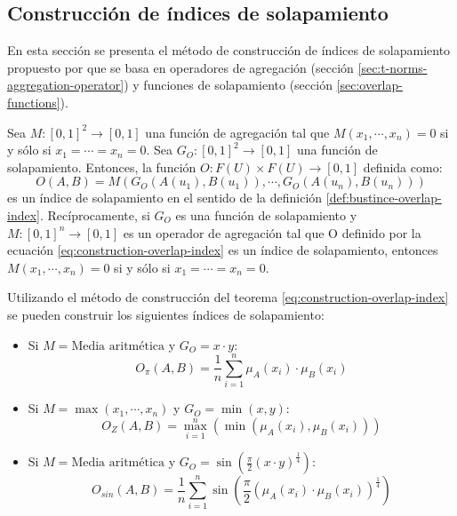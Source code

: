 \subsection{Construcción de índices de solapamiento}\label{sec:overlap-index-construction}
En esta sección se presenta el método de construcción de índices de solapamiento propuesto por \cite{bustince2013overlap} que se basa en operadores de agregación (sección \ref{sec:t-norms-aggregation-operator}) y funciones de solapamiento (sección \ref{sec:overlap-functions}).
\begin{theorem}
Sea $M : [0,1]^{2} \rightarrow [0,1]$ una función de agregación tal que $M(x_{1},\cdots,x_{n}) = 0$ si y sólo si $x_{1} = \cdots = x_{n} = 0$. Sea $G_{O} : [0,1]^{2} \rightarrow [0,1]$ una función de solapamiento. Entonces, la función $O: F(U) \times F(U) \rightarrow [0,1]$ definida como:
\begin{equation}\label{eq:construction-overlap-index}
O(A,B) = M(G_{O}(A(u_{1}),B(u_{1})),\cdots,G_{O}(A(u_{n}),B(u_{n})))
\end{equation}
es un índice de solapamiento en el sentido de la definición \ref{def:bustince-overlap-index}. Recíprocamente, si $G_{O}$ es una función de solapamiento y $M:[0,1]^{n} \rightarrow [0,1]$ es un operador de agregación tal que O definido por la ecuación \ref{eq:construction-overlap-index} es un índice de solapamiento, entonces $M(x_{1},\cdots,x_{n}) = 0$ si y sólo si $x_{1} = \cdots = x_{n} = 0$.
\end{theorem}

\begin{example}
\normalfont
Utilizando el método de construcción del teorema \ref{eq:construction-overlap-index} se pueden construir los siguientes índices de solapamiento:

\begin{itemize}
	\item Si $M = \text{Media aritmética}$ y $G_O = x \cdot y$:
	\begin{equation}
	O_{\pi}(A,B) = \frac{1}{n}\sum_{i=1}^{n}\mu_A(x_i) \cdot \mu_B(x_i)
	\end{equation}
	\item Si $M = \max(x_1,\cdots,x_n)$ y $G_O = \min(x,y)$:
	\begin{equation}
	O_{Z}(A,B) = \max\limits_{i=1}^{n}(\min(\mu_A(x_i),\mu_B(x_i)))
	\end{equation}
	\item Si $M = \text{Media aritmética}$ y $G_O = \sin(\frac{\pi}{2}(x \cdot y)^{\frac{1}{4}})$:
	\begin{equation}
	O_{sin}(A, B) = \frac{1}{n}\sum_{i=1}^{n}\sin(\frac{\pi}{2}(\mu_A(x_i) \cdot \mu_B(x_i))^{\frac{1}{4}})
	\end{equation}
\end{itemize}
\end{example}
